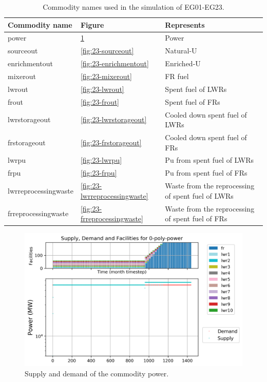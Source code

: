 \documentclass[11pt]{article}
\begin{document}
\begin{table}[!h]
	\centering
	\caption{Commodity names used in the simulation of EG01-EG23.}
	\label{tab:23-commodities}
	\begin{tabularx}{\textwidth}{lLL}
		\hline
		Commodity name  & Figure & Represents \\ \hline
  		power           & \ref{fig:23-power} & Power \\
		sourceout       & \ref{fig:23-sourceout} & Natural-U \\
        enrichmentout   & \ref{fig:23-enrichmentout} & Enriched-U \\
        mixerout        & \ref{fig:23-mixerout} & FR fuel \\
  		lwrout          & \ref{fig:23-lwrout} & Spent fuel of LWRs \\
  		frout           & \ref{fig:23-frout} & Spent fuel of FRs \\
  		lwrstorageout   & \ref{fig:23-lwrstorageout} & Cooled down spent fuel of LWRs \\
  		frstorageout    & \ref{fig:23-frstorageout} & Cooled down spent fuel of FRs \\	
  		lwrpu   & \ref{fig:23-lwrpu} & Pu from spent fuel of LWRs \\
  		frpu    & \ref{fig:23-frpu} & Pu from spent fuel of FRs \\
  		lwrreprocessingwaste & \ref{fig:23-lwrreprocessingwaste} & Waste from the reprocessing of spent fuel of LWRs \\
 		frreprocessingwaste & \ref{fig:23-frreprocessingwaste} & Waste from the reprocessing of spent fuel of FRs \\ \hline

	\end{tabularx}
\end{table}

\begin{figure}[!h]
	\centering
	\includegraphics[width=\textwidth]{23-figures/0-poly-power.png} 
	\hfill
	\caption{Supply and demand of the commodity power.}
	\label{fig:23-power}
\end{figure}
\end{document}
